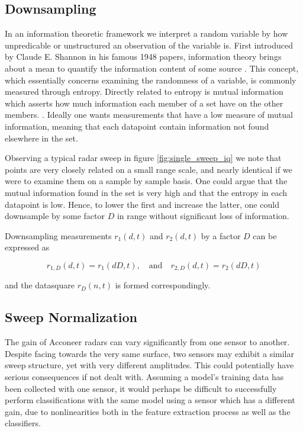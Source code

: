 \subsection{Downsampling}

In an information theoretic framework we interpret a random variable by how unpredicable or unstructured an observation of the variable is\citep{anderson_johnnesson_2006}. First introduced by Claude E. Shannon in his famous 1948 papers, information theory brings about a mean to quantify the information content of some source \citep{shannon_1948}. This concept, which essentially concerns examining the randomness of a variable, is commonly measured through entropy. Directly related to entropy is mutual information which asserts how much information each member of a set have on the other members. \citep{hyvasrinen_karhunen_oja_2004}. Ideally one wants measurements that have a low measure of mutual information, meaning that each datapoint contain information not found elsewhere in the set. 

Observing a typical radar sweep in figure \ref{fig:single_sweep_iq} we note that points are very closely related on a small range scale, and nearly identical if we were to examine them on a sample by sample basis. One could argue that the mutual information found in the set is very high and that the entropy in each datapoint is low. Hence, to lower the first and increase the latter, one could downsample by some factor $D$ in range without significant loss of information.

Downsampling measurements $r_1(d,t)$ and $r_2(d,t)$ by a factor $D$ can be expressed as

\begin{equation}
	r_{1,D}(d, t) = r_{1}(dD,t), 
	\quad \text{and} \quad r_{2,D}(d,t) = r_{2}(dD,t)
\end{equation}

and the datasquare $r_D(n,t)$ is formed correspondingly.

\subsection{Sweep Normalization}
The gain of Acconeer radars can vary significantly from one sensor to another. Despite facing towards the very same surface, two sensors may exhibit a similar sweep structure,  yet with very different amplitudes. This could potentially have serious consequences if not dealt with. Assuming a model's training data has been collected with one sensor, it would perhaps be difficult to successfully perform classifications with the same model using a sensor which has a different gain, due to nonlinearities both in the feature extraction process as well as the classifiers.

